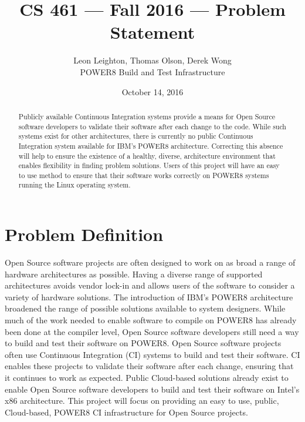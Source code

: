 \documentclass[10pt,letterpaper,onecolumn,draftclsnofoot]{IEEEtran}
\begin{document}
\begin{titlepage}
  \title{CS 461 --- Fall 2016 --- Problem Statement}
  \author{Leon Leighton, Thomas Olson, Derek Wong\\POWER8 Build and Test Infrastructure}
  \date{October 14, 2016}
  \maketitle
  \vspace{4cm}
  \begin{abstract}
  \noindent Publicly available Continuous Integration systems provide a means for Open Source software developers to validate their software after each change to the code.
  While such systems exist for other architectures, there is currently no public Continuous Integration system available for IBM's POWER8 architecture. 
  Correcting this absence will help to ensure the existence of a healthy, diverse, architecture environment that enables flexibility in finding problem solutions. 
  Users of this project will have an easy to use method to ensure that their software works correctly on POWER8 systems running the Linux operating system.
  \end{abstract}
\end{titlepage}

\section*{Problem Definition}
Open Source software projects are often designed to work on as broad a range of hardware architectures as possible. 
Having a diverse range of supported architectures avoids vendor lock-in and allows users of the software to consider a variety of hardware solutions. 
The introduction of IBM's POWER8 architecture broadened the range of possible solutions available to system designers.
While much of the work needed to enable software to compile on POWER8 has already been done at the compiler level, Open Source software developers still need a way to build and test their software on POWER8. 
Open Source software projects often use Continuous Integration (CI) systems to build and test their software. 
CI enables these projects to validate their software after each change, ensuring that it continues to work as expected. 
Public Cloud-based solutions already exist to enable Open Source software developers to build and test their software on Intel's x86 architecture. 
This project will focus on providing an easy to use, public, Cloud-based, POWER8 CI infrastructure for Open Source projects. 
\end{document}
